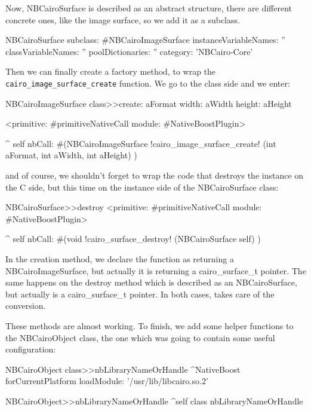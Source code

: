 \documentclass[a4paper,10pt,twoside]{book}
\begin{document}
Now, NBCairoSurface is described as an abstract structure, 
there are different concrete ones, like the image surface,
so we add it as a subclass.


\begin{classdef}{}
NBCairoSurface subclass: #NBCairoImageSurface
	instanceVariableNames: ''
	classVariableNames: ''
	poolDictionaries: ''
	category: 'NBCairo-Core'
\end{classdef}

Then we can finally create a factory method, to wrap the \verb|cairo_image_surface_create| function. We go to the class side and
we enter:

\begin{code}{}
NBCairoImageSurface class>>create: aFormat width: aWidth height: aHeight

	<primitive: #primitiveNativeCall module: #NativeBoostPlugin>
	
	^ self nbCall: #(NBCairoImageSurface !cairo\_image\_surface\_create! (int aFormat,
                                                         int aWidth,
                                                         int aHeight) )
\end{code}

and of course, we shouldn't forget to wrap the code that destroys the instance on the C side, but this time on the instance side of the NBCairoSurface class:

\begin{code}{}
NBCairoSurface>>destroy
	<primitive: #primitiveNativeCall module: #NativeBoostPlugin>
	
	^ self nbCall: #(void !cairo\_surface\_destroy! (NBCairoSurface self) )

\end{code}

In the creation method, we declare the function as returning a
NBCairoImageSurface, but actually it is returning a cairo\_surface\_t
pointer. The same happens on the destroy method which is described
as an NBCairoSurface, but actually is a cairo\_surface\_t pointer.
In both cases, \NativeBoost takes care of the conversion.




These methods are almost working. To finish, we add some helper
functions to the NBCairoObject class, the one which was going
to contain some useful configuration:

\begin{code}{}
NBCairoObject class>>nbLibraryNameOrHandle
	^NativeBoost forCurrentPlatform loadModule: '/usr/lib/libcairo.so.2'

NBCairoObject>>nbLibraryNameOrHandle
	^self class nbLibraryNameOrHandle

\end{code}
\end{document}
